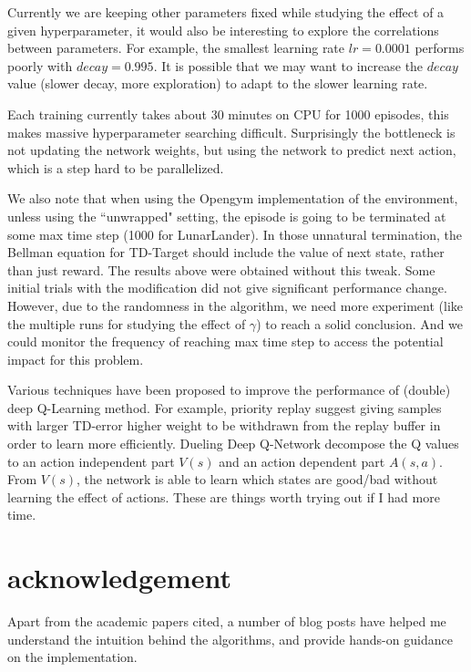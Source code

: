 \documentclass[conference]{IEEEtran}
\begin{document}
Currently we are keeping other parameters fixed while studying the effect of a given hyperparameter, it would also be interesting to explore the correlations between parameters. For example, the smallest learning rate $lr=0.0001$ performs poorly with $decay=0.995$. It is possible that we may want to increase the $decay$ value (slower decay, more exploration) to adapt to the slower learning rate.

Each training currently takes about 30 minutes on CPU for 1000 episodes, this makes massive hyperparameter searching difficult. Surprisingly the bottleneck is not updating the network weights, but using the network to predict next action, which is a step hard to be parallelized.

We also note that when using the Opengym implementation of the environment, unless using the ``unwrapped" setting, the episode is going to be terminated at some max time step (1000 for LunarLander). In those unnatural termination, the Bellman equation for TD-Target should include the value of next state, rather than just reward. The results above were obtained without this tweak. Some initial trials with the modification did not give significant performance change. However, due to the randomness in the algorithm, we need more experiment (like the multiple runs for studying the effect of $\gamma$) to reach a solid conclusion. And we could monitor the frequency of reaching max time step to access the potential impact for this problem.

Various techniques have been proposed to improve the performance of (double) deep Q-Learning method. For example, priority replay\cite{schaul2015prioritized} suggest giving samples with larger TD-error higher weight to be withdrawn from the replay buffer in order to learn more efficiently. Dueling Deep Q-Network\cite{wang2015dueling} decompose the Q values to an action independent part $V(s)$ and an action dependent part $A(s,a)$. From $V(s)$, the network is able to learn which states are good/bad without learning the effect of actions. These are things worth trying out if I had more time.

\section{acknowledgement}
Apart from the academic papers cited, a number of blog posts have helped me understand the intuition behind the algorithms, and provide hands-on guidance on the implementation\cite{ddqn, ddqn2, ddqn3, improvedqn, duelingDQN}.

	


\end{document}
